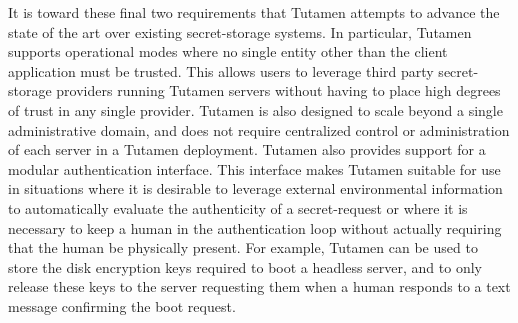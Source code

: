 It is toward these final two requirements that Tutamen attempts to
advance the state of the art over existing secret-storage systems. In
particular, Tutamen supports operational modes where no single entity
other than the client application must be trusted. This allows users
to leverage third party secret-storage providers running Tutamen
servers without having to place high degrees of trust in any single
provider. Tutamen is also designed to scale beyond a single
administrative domain, and does not require centralized control or
administration of each server in a Tutamen deployment. Tutamen also
provides support for a modular authentication interface. This
interface makes Tutamen suitable for use in situations where it is
desirable to leverage external environmental information to
automatically evaluate the authenticity of a secret-request or where
it is necessary to keep a human in the authentication loop without
actually requiring that the human be physically present. For example,
Tutamen can be used to store the disk encryption keys required to boot
a headless server, and to only release these keys to the server
requesting them when a human responds to a text message confirming the
boot request.

